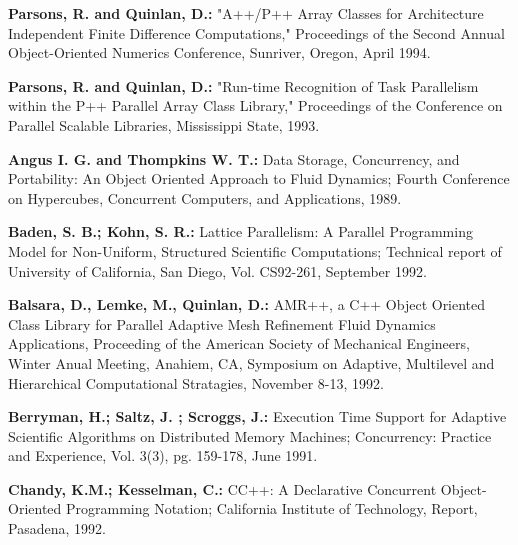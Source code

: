 \begin{thebibliography}{WW}
  {\bf Parsons, R. and Quinlan, D.:}
  "A++/P++ Array Classes for Architecture Independent Finite Difference Computations,"
   Proceedings of the Second Annual Object-Oriented Numerics Conference, Sunriver, Oregon, April 1994.
 
  {\bf Parsons, R. and Quinlan, D.:}
  "Run-time Recognition of Task Parallelism within the P++ Parallel Array Class Library,"
   Proceedings of the Conference on Parallel Scalable Libraries, Mississippi State, 1993.
 


   {\bf Angus I. G. and Thompkins W. T.:}
   Data Storage, Concurrency, and Portability: An Object Oriented
   Approach to Fluid Dynamics; Fourth Conference on Hypercubes,
   Concurrent Computers, and Applications, 1989.

   {\bf Baden, S. B.; Kohn, S. R.: }
   Lattice Parallelism: A Parallel Programming Model for Non-Uniform,
   Structured Scientific Computations; Technical report of University 
   of California, San Diego, Vol. CS92-261, September 1992.

   {\bf Balsara, D., Lemke, M., Quinlan, D.:} AMR++, a C++ Object Oriented
   Class Library for Parallel Adaptive Mesh Refinement Fluid Dynamics
   Applications, Proceeding of the American Society of Mechanical
   Engineers, Winter Anual Meeting, Anahiem, CA, Symposium on Adaptive,
   Multilevel and Hierarchical Computational Stratagies, 
   November 8-13, 1992.

   {\bf Berryman, H.; Saltz, J. ; Scroggs, J.: }
   Execution Time Support for Adaptive Scientific Algorithms on Distributed 
   Memory Machines;
   Concurrency: Practice and Experience, Vol. 3(3), pg. 159-178, June 1991.

   {\bf Chandy, K.M.; Kesselman, C.:}
   CC++: A Declarative Concurrent Object-Oriented Programming
   Notation; California Institute of Technology, Report, Pasadena, 1992.


\end{thebibliography}
